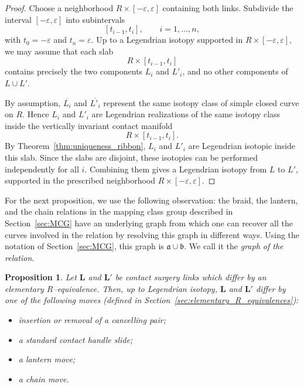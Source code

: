 \documentclass{amsart}
\numberwithin{equation}{section}
\numberwithin{figure}{section}
\newtheorem{proposition}[theorem]{Proposition}
\theoremstyle{definition}
\theoremstyle{remark}
\renewcommand{\aa}{\mathfrak{a}}
\newcommand{\bb}{\mathfrak{b}}
\begin{document}
\begin{proof}
Choose a neighborhood $
R\times[-\varepsilon,\varepsilon]$
containing both links. Subdivide the interval \([-\varepsilon,\varepsilon]\) into subintervals
\[
[t_{i-1},t_i],
\qquad i=1,\ldots,n,
\]
with \(t_0=-\varepsilon\) and \(t_n=\varepsilon\). Up to a Legendrian isotopy supported in \(R\times[-\varepsilon,\varepsilon]\), we may assume that each slab
\[
R\times[t_{i-1},t_i]
\]
contains precisely the two components \(L_i\) and \(L'_i\), and no other components of \(L\cup L'\).

By assumption, \(\overline{L_i}\) and \(\overline{L'_i}\) represent the same isotopy class of simple closed curve on \(R\). Hence \(L_i\) and \(L'_i\) are Legendrian realizations of the same isotopy class inside the vertically invariant contact manifold
\[
R\times[t_{i-1},t_i].
\]
By Theorem~\ref{thm:uniqueness_ribbon}, \(L_i\) and \(L'_i\) are Legendrian isotopic inside this slab. Since the slabs are disjoint, these isotopies can be performed independently for all \(i\). Combining them gives a Legendrian isotopy from \(L\) to \(L'\), supported in the prescribed neighborhood \(R\times[-\varepsilon,\varepsilon]\).
\end{proof}

For the next proposition, we use the following observation: the braid, the lantern, and the chain relations in the mapping class group described in Section~\ref{sec:MCG} have an underlying graph from which one can recover all the curves involved in the relation by resolving this graph in different ways. Using the notation of Section~\ref{sec:MCG}, this graph is $\aa\cup\bb$. We call it the \textit{graph of the relation}.

\begin{proposition}\label{uniq_cont_Kirby}
  Let $\boldsymbol{L}$ and $\boldsymbol{L}'$ be contact surgery links which differ by an elementary $R$–equivalence. Then, up to Legendrian isotopy, $\boldsymbol{L}$ and $\boldsymbol{L}'$ differ by one of the following moves (defined in Section~\ref{sec:elementary_R_equivalences}):
  \begin{itemize}
    \item insertion or removal of a cancelling pair;
    \item a standard contact handle slide;
    \item a lantern move;
    \item a chain move.
  \end{itemize}
\end{proposition}
\end{document}
